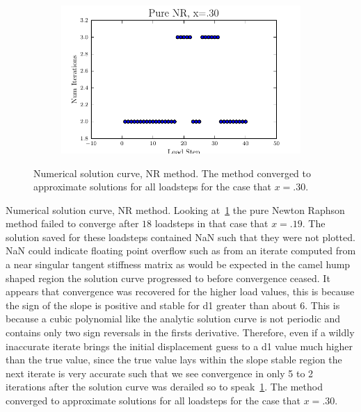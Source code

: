 \documentclass[10pt,letterpaper]{article}
\begin{document}
\begin{figure}[!tbh]
\begin{subfigure}[b]{.6\textwidth}
    \caption{}
    \label{fig2:label:c}
  \end{subfigure}
  \hfill
  \begin{subfigure}[b]{.6\textwidth}
    \includegraphics[width=1\textwidth]{pure_nr_x30_conv.pdf}
    \caption{}
    \label{fig2:label:d}
  \end{subfigure}
  \caption{Numerical solution curve, NR method. The method converged to approximate solutions for all loadsteps for the case that $x=.30$.
}
\end{figure}

Numerical solution curve, NR method. Looking at~\ref{fig2:label:c} the pure Newton Raphson method failed to converge after $18$ loadsteps in that case that $x=.19$. The solution saved for these loadsteps contained NaN such that they were not plotted. NaN could indicate floating point overflow such as from an iterate computed from a near singular tangent stiffness matrix as would be expected in the camel hump shaped region the solution curve progressed to before convergence ceased. It appears that convergence was recovered for the higher load values, this is because the sign of the slope is positive and stable for d1 greater than about 6. This is because a cubic polynomial like the analytic solution curve is not periodic and contains only two sign reversals in the firsts derivative. Therefore, even if a wildly inaccurate iterate brings the initial displacement guess to a d1 value much higher than the true value, since the true value lays within the slope stable region the next iterate is very accurate such that we see convergence in only 5 to 2 iterations after the solution curve was derailed so to speak~\ref{fig2:label:c}. 
The method converged to approximate solutions for all loadsteps for the case that $x=.30$.
\end{document}
